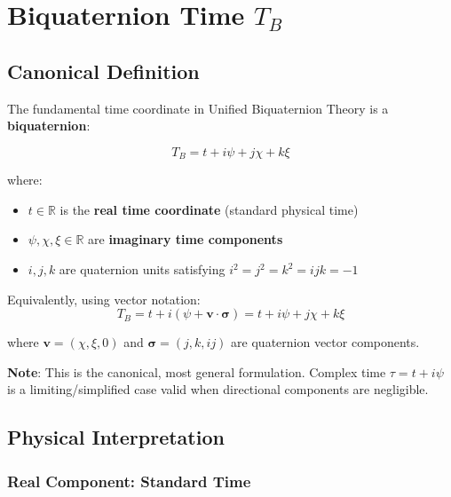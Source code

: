
\section{Biquaternion Time $T_B$}
\label{sec:canonical:biquaternion_time}

\subsection{Canonical Definition}

The fundamental time coordinate in Unified Biquaternion Theory is a \textbf{biquaternion}:

\begin{equation}
\label{eq:canonical:biquaternion_time}
\boxed{T_B = t + i\psi + j\chi + k\xi}
\end{equation}

\noindent where:
\begin{itemize}
    \item $t \in \mathbb{R}$ is the \textbf{real time coordinate} (standard physical time)
    \item $\psi, \chi, \xi \in \mathbb{R}$ are \textbf{imaginary time components}
    \item $i, j, k$ are quaternion units satisfying $i^2 = j^2 = k^2 = ijk = -1$
\end{itemize}

Equivalently, using vector notation:
\begin{equation}
\label{eq:canonical:biquaternion_time_vector}
T_B = t + i(\psi + \mathbf{v} \cdot \boldsymbol{\sigma}) = t + i\psi + j\chi + k\xi
\end{equation}

where $\mathbf{v} = (\chi, \xi, 0)$ and $\boldsymbol{\sigma} = (j, k, ij)$ are quaternion vector components.

\textbf{Note}: This is the canonical, most general formulation. Complex time $\tau = t + i\psi$ is a limiting/simplified case valid when directional components are negligible.

\subsection{Physical Interpretation}

\subsubsection{Real Component: Standard Time}

